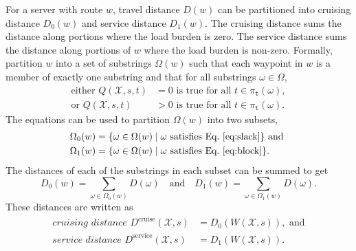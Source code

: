 For a server with route $w$, travel distance $D(w)$ can be partitioned into
cruising distance $D_0(w)$ and
service distance $D_1(w)$.
The cruising distance sums the distance along portions where the load burden is zero.
The service distance sums the distance along portions of $w$ where the
load burden is non-zero.
Formally, partition $w$ into a set of substrings $\Omega(w)$ such that each waypoint
in $w$ is a member of exactly one substring and that for all substrings $\omega\in \Omega$,
\begin{align}
\label{eq:slack}\textrm{either }Q(\mathcal{X},s,t)&=0\textrm{ is true for all }t\in \pi_\texttt{t}(\omega),\\
\label{eq:block}\textrm{or }Q(\mathcal{X},s,t)&>0\textrm{ is true for all }t\in \pi_\texttt{t}(\omega).
\end{align}
The equations can be used to partition $\Omega(w)$ into two subsets,
\begin{align*}
\Omega_0(w)&=\{\omega\in \Omega(w)\mid \omega\textrm{ satisfies Eq.~\ref{eq:slack}}\}\textrm{ and }\\
\Omega_1(w)&=\{\omega\in \Omega(w)\mid \omega\textrm{ satisfies Eq.~\ref{eq:block}}\}.
\end{align*}
The distances of each of the substrings in each subset can be summed
to get
$$D_0(w)=\sum_{\omega\in \Omega_0(w)} D(\omega)\quad\textrm{and}\quad
  D_1(w)=\sum_{\omega\in \Omega_1(w)} D(\omega).$$
These distances are written as
\begin{align}
\label{eq:cruising-distance}
\textit{cruising distance }D^\textrm{cruise} (\mathcal{X},s)&=D_0(W(\mathcal{X},s)),\textrm{ and}\\
\label{eq:service-distance}
\textit{service distance } D^\textrm{service}(\mathcal{X},s)&=D_1(W(\mathcal{X},s)).
\end{align}

